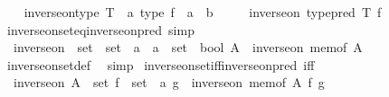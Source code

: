 \begin{isabellebody}
\ \ \isamarkupfalse%
\ {\isachardoublequoteopen}inverse{\isacharunderscore}{\kern0pt}on{\isacharunderscore}{\kern0pt}type\ {\isacharparenleft}{\kern0pt}T\ {\isacharcolon}{\kern0pt}{\isacharcolon}{\kern0pt}\ {\isacharprime}{\kern0pt}a\ type{\isacharparenright}{\kern0pt}\ {\isacharparenleft}{\kern0pt}f\ {\isacharcolon}{\kern0pt}{\isacharcolon}{\kern0pt}\ {\isacharprime}{\kern0pt}a\ {\isasymRightarrow}\ {\isacharprime}{\kern0pt}b{\isacharparenright}{\kern0pt}\ {\isasymequiv}\isanewline
\ \ \ \ inverse{\isacharunderscore}{\kern0pt}on\ {\isacharparenleft}{\kern0pt}type{\isacharunderscore}{\kern0pt}pred\ T{\isacharparenright}{\kern0pt}\ f{\isachardoublequoteclose}\isanewline
{}\isamarkupfalse%
\isanewline
\isanewline
{}\isamarkupfalse%
\ inverse{\isacharunderscore}{\kern0pt}on{\isacharunderscore}{\kern0pt}set{\isacharunderscore}{\kern0pt}eq{\isacharunderscore}{\kern0pt}inverse{\isacharunderscore}{\kern0pt}on{\isacharunderscore}{\kern0pt}pred\ {\isacharbrackleft}{\kern0pt}simp{\isacharbrackright}{\kern0pt}{\isacharcolon}{\kern0pt}\isanewline
\ \ {\isachardoublequoteopen}{\isacharparenleft}{\kern0pt}inverse{\isacharunderscore}{\kern0pt}on\ {\isacharcolon}{\kern0pt}{\isacharcolon}{\kern0pt}\ set\ {\isasymRightarrow}\ {\isacharparenleft}{\kern0pt}set\ {\isasymRightarrow}\ {\isacharprime}{\kern0pt}a{\isacharparenright}{\kern0pt}\ {\isasymRightarrow}\ {\isacharparenleft}{\kern0pt}{\isacharprime}{\kern0pt}a\ {\isasymRightarrow}\ set{\isacharparenright}{\kern0pt}\ {\isasymRightarrow}\ bool{\isacharparenright}{\kern0pt}\ A\ {\isacharequal}{\kern0pt}\ inverse{\isacharunderscore}{\kern0pt}on\ {\isacharparenleft}{\kern0pt}mem{\isacharunderscore}{\kern0pt}of\ A{\isacharparenright}{\kern0pt}{\isachardoublequoteclose}\isanewline
%
\isadelimproof
\ \ %
\endisadelimproof
%
\isatagproof
{}\isamarkupfalse%
\ inverse{\isacharunderscore}{\kern0pt}on{\isacharunderscore}{\kern0pt}set{\isacharunderscore}{\kern0pt}def\ \isamarkupfalse%
\ simp%
\endisatagproof
{\isafoldproof}%
%
\isadelimproof
\isanewline
%
\endisadelimproof
\isanewline
{}\isamarkupfalse%
\ inverse{\isacharunderscore}{\kern0pt}on{\isacharunderscore}{\kern0pt}set{\isacharunderscore}{\kern0pt}iff{\isacharunderscore}{\kern0pt}inverse{\isacharunderscore}{\kern0pt}on{\isacharunderscore}{\kern0pt}pred\ {\isacharbrackleft}{\kern0pt}iff{\isacharbrackright}{\kern0pt}{\isacharcolon}{\kern0pt}\isanewline
\ \ {\isachardoublequoteopen}inverse{\isacharunderscore}{\kern0pt}on\ {\isacharparenleft}{\kern0pt}A\ {\isacharcolon}{\kern0pt}{\isacharcolon}{\kern0pt}\ set{\isacharparenright}{\kern0pt}\ {\isacharparenleft}{\kern0pt}f\ {\isacharcolon}{\kern0pt}{\isacharcolon}{\kern0pt}\ set\ {\isasymRightarrow}\ {\isacharprime}{\kern0pt}a{\isacharparenright}{\kern0pt}\ g\ {\isasymlongleftrightarrow}\ inverse{\isacharunderscore}{\kern0pt}on\ {\isacharparenleft}{\kern0pt}mem{\isacharunderscore}{\kern0pt}of\ A{\isacharparenright}{\kern0pt}\ f\ g{\isachardoublequoteclose}\isanewline

\end{isabellebody}
